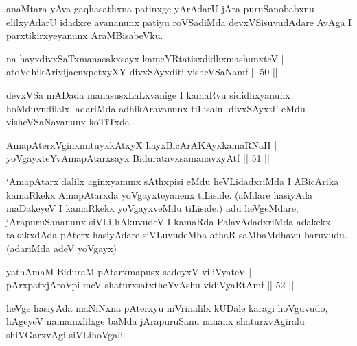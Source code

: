 \begin{artha}
anaMtara yAva gaqhasathxna patinxge yArAdarU jAra puruSanobabxnu elilxyAdarU idadxre avananunx patiyu roVSadiMda devxVSisuvudAdare AvAga I parxtikirxyeyanunx AraMBisabeVku.
\end{artha}


\begin{shl}
na hayxdivxSaTxmanasakxsayx kameYRtatisxdidhxmashunxteV | \\
atoV\s dhikArivijacnxpetxyXY divxSAyxditi visheVSaNamf \hfill|| 50 || 
\end{shl}

\begin{artha}
devxVSa mADada manasusxLaLxvanige I kamaRvu sididhxyanunx hoMduvudilalx. adariMda adhikAravanunx tiLisalu `divxSAyxtf' eMdu visheVSaNavanunx koTiTxde.
\end{artha}


\begin{shl}
AmapAterxV\s ginxmituyxkAtxyX hayxBicArAKAyxkamaRNaH | \\
yoVgayxteYvA\s \s mapAtarxsayx BiduratavxsamanavxyAtf \hfill|| 51 || 
\end{shl}

\begin{artha}
`AmapAtarx'dalilx aginxyanunx sAthxpisi eMdu heVLidadxriMda I ABicArika kamaRkekx AmapAtarxda yoVgayxteyanenx tiLiside. (aMdare hasiyAda maDakeyeV I kamaRkekx yoVgayxveMdu tiLiside.) adu heVgeMdare, jArapuruSananunx siVLi hAkuvudeV I kamaRda PalavAdadxriMda adakekx takakxdAda pAterx hasiyAdare siVLuvudeMba athaR saMbaMdhavu baruvudu. (adariMda adeV yoVgayx)
\end{artha}


\begin{shl}
yathA\s \s maM BiduraM pAtarxmapusx sadoyxV viliVyateV | \\
pArxpatxjAroV\s pi meV shaturxsatxtheYvA\s \s shu vidiVyaRtAmf \hfill|| 52 || 
\end{shl}

\begin{artha}
heVge hasiyAda maNiNxna pAterxyu niVrinalilx kUDale karagi hoVguvudo, hAgeyeV namamxlilxge baMda jArapuruSanu nananx shaturxvAgiralu shiVGarxvAgi siVLihoVgali.
\end{artha}

